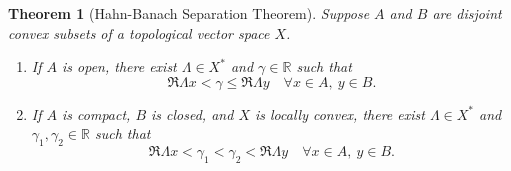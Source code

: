 \documentclass[11pt]{article}
\theoremstyle{thmstyle}
\newtheorem{theorem}{Theorem}[section]
\theoremstyle{defstyle}
\newcommand{\R}{\mathbb{R}}
\renewcommand{\le}{\leqslant}
\begin{document}
\begin{theorem}[Hahn-Banach Separation Theorem]
    Suppose $A$ and $B$ are disjoint convex subsets of a topological vector space $X$. 
    \begin{enumerate}[label=(\alph*)]
        \item If $A$ is open, there exist $\Lambda\in X^\ast$ and $\gamma\in\R$ such that 
        \begin{equation*}
            \Re\Lambda x < \gamma\le\Re\Lambda y\quad\forall x\in A,~y\in B.
        \end{equation*}
        \item If $A$ is compact, $B$ is closed, and $X$ is locally convex, there exist $\Lambda\in X^\ast$ and $\gamma_1,\gamma_2\in\R$ such that 
        \begin{equation*}
            \Re\Lambda x < \gamma_1 < \gamma_2 < \Re\Lambda y\quad\forall x\in A,~y\in B.
        \end{equation*}
    \end{enumerate}
\end{theorem}
\end{document}
